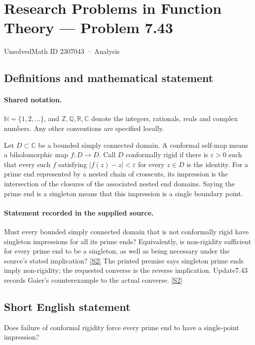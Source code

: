 \documentclass[11pt]{article}
\newcommand{\sref}[2]{\hyperlink{source:#1:#2}{[S#2]}}
\begin{document}
\setcounter{section}{2307042}
\section{Research Problems in Function Theory — Problem 7.43}\label{2307043}
{\small\sffamily UnsolvedMath ID 2307043 · Analysis}
\subsection{Definitions and mathematical statement}

\paragraph{Shared notation.}$\mathbb N=\{1,2,\ldots\}$, and $\mathbb Z,\mathbb Q,\mathbb R,\mathbb C$ denote the integers, rationals, reals and complex numbers. Any other conventions are specified locally.


Let $D\subset\mathbb C$ be a bounded simply connected domain. A conformal self-map means a biholomorphic map $f:D\to D$. Call $D$ conformally rigid if there is $\varepsilon>0$ such that every such $f$ satisfying $|f(z)-z|<\varepsilon$ for every $z\in D$ is the identity. For a prime end represented by a nested chain of crosscuts, its impression is the intersection of the closures of the associated nested end domains. Saying the prime end is a singleton means that this impression is a single boundary point.

\paragraph{Statement recorded in the supplied source.}
Must every bounded simply connected domain that is not conformally rigid have singleton impressions for all its prime ends? Equivalently, is non-rigidity sufficient for every prime end to be a singleton, as well as being necessary under the source's stated implication? \sref{2307043}{2}
The printed premise says singleton prime ends imply non-rigidity; the requested converse is the reverse implication. Update7.43 records Gaier's counterexample to the actual converse. \sref{2307043}{2}
\subsection{Short English statement}
Does failure of conformal rigidity force every prime end to have a single-point impression?
\end{document}
